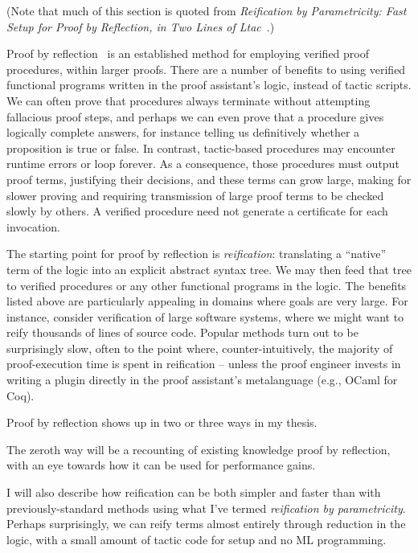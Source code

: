 \documentclass[twoside]{article}
\begin{document}
{(Note that much of this section is quoted from \emph{Reification by Parametricity: Fast Setup for Proof by Reflection, in Two Lines of {L}tac}~\cite{reification-by-parametricity}.)

Proof by reflection~\cite{ReflectionTACS97} is an established method for employing verified proof procedures, within larger proofs.
There are a number of benefits to using verified functional programs written in the proof assistant's logic, instead of tactic scripts.
We can often prove that procedures always terminate without attempting fallacious proof steps, and perhaps we can even prove that a procedure gives logically complete answers, for instance telling us definitively whether a proposition is true or false.
In contrast, tactic-based procedures may encounter runtime errors or loop forever.
As a consequence, those procedures must output proof terms, justifying their decisions, and these terms can grow large, making for slower proving and requiring transmission of large proof terms to be checked slowly by others.
A verified procedure need not generate a certificate for each invocation.

The starting point for proof by reflection is \emph{reification}: translating a ``native'' term of the logic into an explicit abstract syntax tree.
We may then feed that tree to verified procedures or any other functional programs in the logic.
The benefits listed above are particularly appealing in domains where goals are very large.
For instance, consider verification of large software systems, where we might want to reify thousands of lines of source code.
Popular methods turn out to be surprisingly slow, often to the point where, counter-intuitively, the majority of proof-execution time is spent in reification -- unless the proof engineer invests in writing a plugin directly in the proof assistant's metalanguage (e.g., OCaml for Coq).

Proof by reflection shows up in two or three ways in my thesis.

The zeroth way will be a recounting of existing knowledge proof by reflection, with an eye towards how it can be used for performance gains.

I will also describe how reification can be both simpler and faster than with previously-standard methods using what I've termed \emph{reification by parametricity}.
Perhaps surprisingly, we can reify terms almost entirely through reduction in the logic, with a small amount of tactic code for setup and no ML programming.

}
\end{document}
